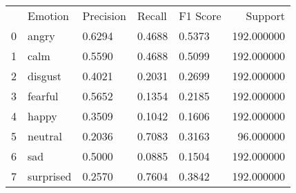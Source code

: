 \begin{tabular}{lllllr}
 & Emotion & Precision & Recall & F1 Score & Support \\
0 & angry & 0.6294 & 0.4688 & 0.5373 & 192.000000 \\
1 & calm & 0.5590 & 0.4688 & 0.5099 & 192.000000 \\
2 & disgust & 0.4021 & 0.2031 & 0.2699 & 192.000000 \\
3 & fearful & 0.5652 & 0.1354 & 0.2185 & 192.000000 \\
4 & happy & 0.3509 & 0.1042 & 0.1606 & 192.000000 \\
5 & neutral & 0.2036 & 0.7083 & 0.3163 & 96.000000 \\
6 & sad & 0.5000 & 0.0885 & 0.1504 & 192.000000 \\
7 & surprised & 0.2570 & 0.7604 & 0.3842 & 192.000000 \\
\end{tabular}
